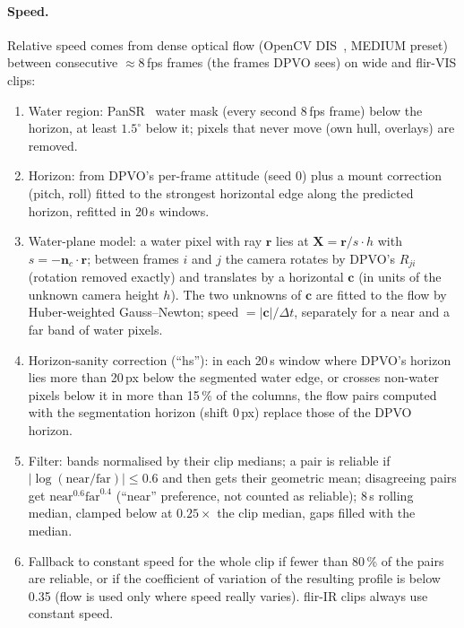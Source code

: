 \documentclass[11pt]{article}
\begin{document}
\paragraph{Speed.}
Relative speed comes from dense optical flow (OpenCV DIS~\cite{kroeger2016dis}, MEDIUM preset) between consecutive
$\approx$8\,fps frames (the frames DPVO sees) on wide and flir-VIS clips:
\begin{enumerate}[nosep]
  \item Water region: PanSR~\cite{zust2026pansr} water mask (every second 8\,fps frame) below the horizon, at least
    $1.5^\circ$ below it; pixels that never move (own hull, overlays) are removed.
  \item Horizon: from DPVO's per-frame attitude (seed 0) plus a mount correction (pitch, roll) fitted to the
    strongest horizontal edge along the predicted horizon, refitted in 20\,s windows.
  \item Water-plane model: a water pixel with ray $\mathbf r$ lies at $\mathbf X=\mathbf r/s\cdot h$ with
    $s=-\mathbf n_c\!\cdot\mathbf r$; between frames $i$ and $j$ the camera rotates by DPVO's $R_{ji}$ (rotation
    removed exactly) and translates by a horizontal $\mathbf c$ (in units of the unknown camera height $h$). The
    two unknowns of $\mathbf c$ are fitted to the flow by Huber-weighted Gauss--Newton; speed $=|\mathbf c|/\Delta t$,
    separately for a near and a far band of water pixels.
  \item Horizon-sanity correction (``hs''): in each 20\,s window where DPVO's horizon lies more than 20\,px below
    the segmented water edge, or crosses non-water pixels below it in more than 15\,\% of the columns, the flow
    pairs computed with the segmentation horizon (shift 0\,px) replace those of the DPVO horizon.
  \item Filter: bands normalised by their clip medians; a pair is reliable if $|\log(\text{near}/\text{far})|\le0.6$
    and then gets their geometric mean; disagreeing pairs get $\text{near}^{0.6}\text{far}^{0.4}$ (``near'' preference,
    not counted as reliable); 8\,s rolling median, clamped below at $0.25\times$ the clip median, gaps filled with the
    median.
  \item Fallback to constant speed for the whole clip if fewer than 80\,\% of the pairs are reliable, or if the
    coefficient of variation of the resulting profile is below 0.35 (flow is used only where speed really varies).
    flir-IR clips always use constant speed.
\end{enumerate}
\end{document}
